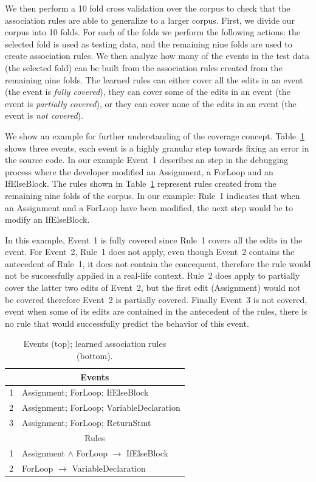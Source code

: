 \documentclass[sigconf]{acmart}
\begin{document}
We then perform a 10 fold cross validation over the corpus to 
check that the association rules are able to generalize to a
larger corpus. First, we divide our corpus into 10 folds.
For each of the folds we perform the following actions:
the selected fold is used as testing data, and the
remaining nine folds are used to create association rules.
We then analyze how many of the events in the test data
(the selected fold) can be built from the association 
rules created from the remaining nine folds.
The learned rules can either cover all the edits in an event (the 
event is \emph{fully covered}), they can cover some of the edits in an 
event (the event is \emph{partially covered}), or they can cover none of
the edits in an event (the event is \emph{not covered}).

We show an example for further understanding of the coverage concept.
Table~\ref{rulesandinstances} shows three events, each event is a 
highly granular step towards fixing an error in the source code. In 
our example Event~1 describes an step in the debugging process 
where the developer modified an Assignment, a ForLoop and an IfElseBlock.
The rules shown in Table~\ref{rulesandinstances} represent rules created
from the remaining nine folds of the corpus. In our example: Rule~1 
indicates that when an Assignment and a ForLoop have been modified,
the next step would be to modify an IfElseBlock.

In this example, Event~1 is fully covered since Rule~1 covers all
the edits in the event. For Event~2, Rule~1 does not apply, even though
Event~2 contains the antecedent of Rule~1, it does not contain the 
concequent, therefore the rule would not be successfully applied in a
real-life context. Rule~2 does apply to partially cover the latter two
edits of Event~2, but the first edit (Assignment) would not be covered
therefore Event~2 is partially covered. Finally Event~3 is not covered,
event when some of its edits are contained in the antecedent of the rules,
there is no rule that would successfully predict the behavior of this 
event. 


\begin{table}[ht]
  \centering
  \caption{Events (top); learned association rules (bottom). \label{rulesandinstances}}{\small
\begin{tabular}{ll}
\toprule
\multicolumn{2}{c}{Events} \\
\midrule
1 & Assignment; ForLoop; IfElseBlock  \\
2 & Assignment; ForLoop; VariableDeclaration\\  
3 & Assignment; ForLoop;  ReturnStmt \\
\midrule
 \multicolumn{2}{c}{Rules} \\                     
\midrule
1 & Assignment $\wedge$ ForLoop $\rightarrow$ IfElseBlock \\  
2 & ForLoop $\rightarrow$ VariableDeclaration \\   
\bottomrule
\end{tabular}

}
\end{table}
\end{document}
